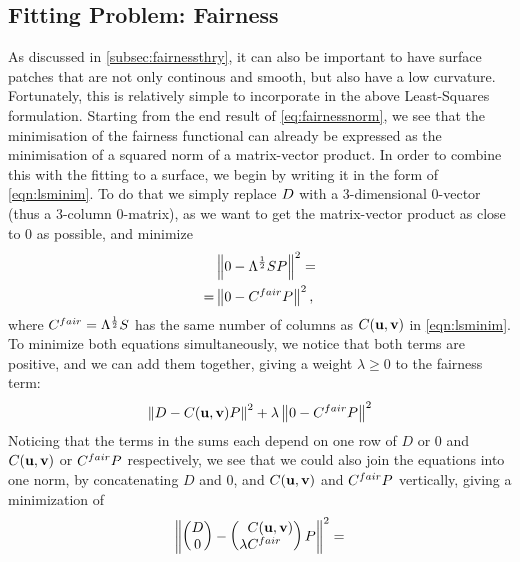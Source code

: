 \subsection{Fitting Problem: Fairness}
\label{subsec:lsqfairness}
As discussed in \autoref{subsec:fairnessthry}, it can also be important to have surface patches that are not only continous and smooth, but also have a low curvature. Fortunately, this is relatively simple to incorporate in the above Least-Squares formulation. Starting from the end result of \autoref{eq:fairnessnorm}, we see that the minimisation of the fairness functional can already be expressed as the minimisation of a squared norm of a matrix-vector product. In order to combine this with the fitting to a surface, we begin by writing it in the form of \autoref{eqn:lsminim}. To do that we simply replace $\lsDataPointMatrix$ with a 3-dimensional $0$-vector (thus a 3-column $0$-matrix), as we want to get the matrix-vector product as close to $0$ as possible, and minimize
\begin{align*}
\phantom{=}& \norm{0 - \Lambda^{\frac{1}{2}} S \lsControlPointMatrix}^2 =
\\
=& \norm{0 - \lsControlPointCoefMatrix^{fair}\lsControlPointMatrix}^2,
\end{align*}
where $\lsControlPointCoefMatrix^{fair} = \Lambda^{\frac{1}{2}} S$ has the same number of columns as $\lsControlPointCoefMatrix(\vec{u},\vec{v})$ in \autoref{eqn:lsminim}. %
To minimize both equations simultaneously, we notice that both terms are positive, and we can add them together, giving a weight $\lambda \geq 0$ to the fairness term:
\begin{equation}
\norm{\lsDataPointMatrix - \lsControlPointCoefMatrix(\vec{u},\vec{v}) \lsControlPointMatrix }^2 + \lambda \norm{0 - \lsControlPointCoefMatrix^{fair}\lsControlPointMatrix }^2
\end{equation}
Noticing that the terms in the sums each depend on one row of $D$ or $0$ and $\lsControlPointCoefMatrix(\vec{u},\vec{v})$ or $\lsControlPointCoefMatrix^{fair}\lsControlPointMatrix$ respectively, we see that we could also join the equations into one norm, by concatenating $D$ and $0$, and $\lsControlPointCoefMatrix(\vec{u},\vec{v})$ and $\lsControlPointCoefMatrix^{fair}\lsControlPointMatrix$ vertically, giving a minimization of
\begin{equation*}
\norm{
\begin{pmatrix}
\lsDataPointMatrix \\ 0
\end{pmatrix} -
\begin{pmatrix*}[l]
\phantom{\lambda}\lsControlPointCoefMatrix(\vec{u},\vec{v}) \\ \lambda \lsControlPointCoefMatrix^{fair}
\end{pmatrix*}
\lsControlPointMatrix 
}^2 =
\end{equation*}

